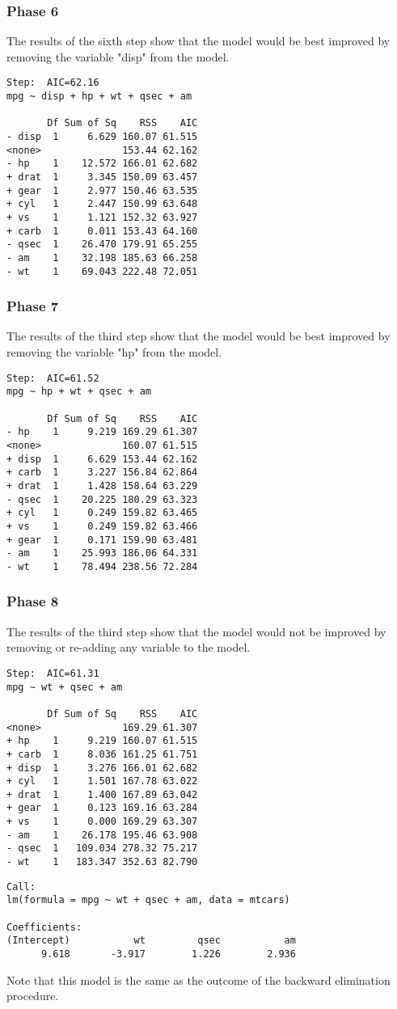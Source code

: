 \subsubsection{Phase 6}
The results of the sixth step show that the model would be best improved by removing the variable "disp" from the model.
\footnotesize
\begin{verbatim}
Step:  AIC=62.16
mpg ~ disp + hp + wt + qsec + am

       Df Sum of Sq    RSS    AIC
- disp  1     6.629 160.07 61.515
<none>              153.44 62.162
- hp    1    12.572 166.01 62.682
+ drat  1     3.345 150.09 63.457
+ gear  1     2.977 150.46 63.535
+ cyl   1     2.447 150.99 63.648
+ vs    1     1.121 152.32 63.927
+ carb  1     0.011 153.43 64.160
- qsec  1    26.470 179.91 65.255
- am    1    32.198 185.63 66.258
- wt    1    69.043 222.48 72.051
\end{verbatim}
\normalsize
\newpage
\subsubsection{Phase 7}
The results of the third step show that the model would be best improved by removing the variable "hp" from the model.
\footnotesize
\begin{verbatim}
Step:  AIC=61.52
mpg ~ hp + wt + qsec + am

       Df Sum of Sq    RSS    AIC
- hp    1     9.219 169.29 61.307
<none>              160.07 61.515
+ disp  1     6.629 153.44 62.162
+ carb  1     3.227 156.84 62.864
+ drat  1     1.428 158.64 63.229
- qsec  1    20.225 180.29 63.323
+ cyl   1     0.249 159.82 63.465
+ vs    1     0.249 159.82 63.466
+ gear  1     0.171 159.90 63.481
- am    1    25.993 186.06 64.331
- wt    1    78.494 238.56 72.284
\end{verbatim}
\normalsize
\subsubsection{Phase 8}
The results of the third step show that the model would not be improved by removing or re-adding any variable to the model.
\footnotesize
\begin{verbatim}
Step:  AIC=61.31
mpg ~ wt + qsec + am

       Df Sum of Sq    RSS    AIC
<none>              169.29 61.307
+ hp    1     9.219 160.07 61.515
+ carb  1     8.036 161.25 61.751
+ disp  1     3.276 166.01 62.682
+ cyl   1     1.501 167.78 63.022
+ drat  1     1.400 167.89 63.042
+ gear  1     0.123 169.16 63.284
+ vs    1     0.000 169.29 63.307
- am    1    26.178 195.46 63.908
- qsec  1   109.034 278.32 75.217
- wt    1   183.347 352.63 82.790
\end{verbatim}
\normalsize
\footnotesize
\begin{verbatim}
Call:
lm(formula = mpg ~ wt + qsec + am, data = mtcars)

Coefficients:
(Intercept)           wt         qsec           am
      9.618       -3.917        1.226        2.936
\end{verbatim}
\normalsize
Note that this model is the same as the outcome of the backward elimination procedure.

